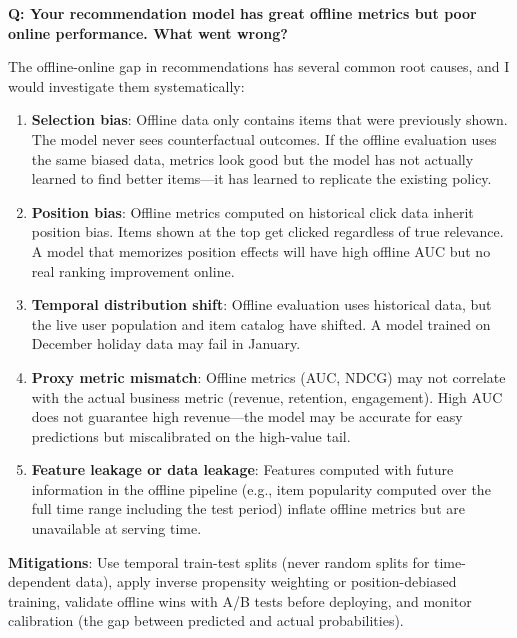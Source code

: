 \begin{interviewq}
\textbf{Q: Your recommendation model has great offline metrics but poor online performance. What went wrong?}

 \quad {} \quad \badgefreq{\freqhigh}

\stronganswer

The offline-online gap in recommendations has several common root causes, and I would investigate them systematically:

\begin{enumerate}
    \item \textbf{Selection bias}: Offline data only contains items that were previously shown. The model never sees counterfactual outcomes. If the offline evaluation uses the same biased data, metrics look good but the model has not actually learned to find better items---it has learned to replicate the existing policy.

    \item \textbf{Position bias}: Offline metrics computed on historical click data inherit position bias. Items shown at the top get clicked regardless of true relevance. A model that memorizes position effects will have high offline AUC but no real ranking improvement online.

    \item \textbf{Temporal distribution shift}: Offline evaluation uses historical data, but the live user population and item catalog have shifted. A model trained on December holiday data may fail in January.

    \item \textbf{Proxy metric mismatch}: Offline metrics (AUC, NDCG) may not correlate with the actual business metric (revenue, retention, engagement). High AUC does not guarantee high revenue---the model may be accurate for easy predictions but miscalibrated on the high-value tail.

    \item \textbf{Feature leakage or data leakage}: Features computed with future information in the offline pipeline (e.g., item popularity computed over the full time range including the test period) inflate offline metrics but are unavailable at serving time.
\end{enumerate}

\textbf{Mitigations}: Use temporal train-test splits (never random splits for time-dependent data), apply inverse propensity weighting or position-debiased training, validate offline wins with A/B tests before deploying, and monitor calibration (the gap between predicted and actual probabilities).


\end{interviewq}
